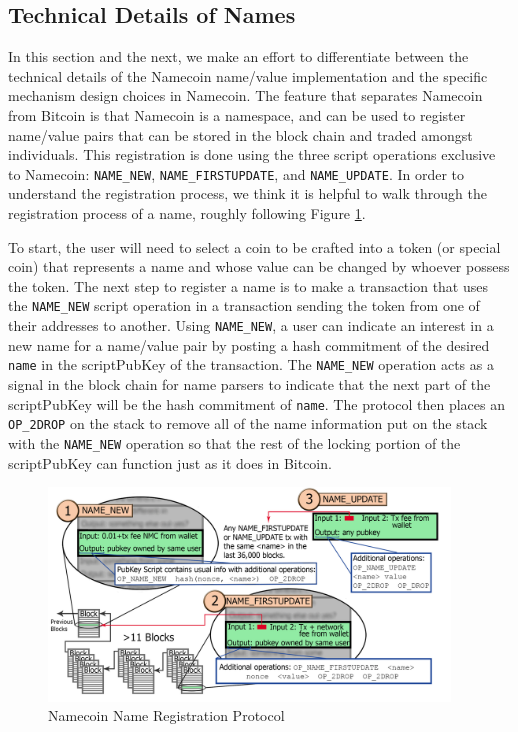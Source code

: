 \subsection{Technical Details of Names}

In this section and the next, we make an effort to differentiate between the technical details of the Namecoin name/value implementation and the specific mechanism design choices in Namecoin. The feature that separates Namecoin from Bitcoin is that Namecoin is a namespace, and can be used to register name/value pairs that can be stored in the block chain and traded amongst individuals. This registration is done using the three script operations exclusive to Namecoin: {\tt NAME\_NEW}, {\tt NAME\_FIRSTUPDATE}, and {\tt NAME\_UPDATE}. In order to understand the registration process, we think it is helpful to walk through the registration process of a name, roughly following Figure \ref{fig:registration}. 

To start, the user will need to select a coin to be crafted into a token (or special coin) that represents a name and whose value can be changed by whoever possess the token. The next step to register a name is to make a transaction that uses the {\tt NAME\_NEW} script operation in a transaction sending the token from one of their addresses to another. Using {\tt NAME\_NEW}, a user can indicate an interest in a new name for a name/value pair by posting a hash commitment of the desired {\tt name} in the scriptPubKey of the transaction. The {\tt NAME\_NEW} operation acts as a signal in the block chain for name parsers to indicate that the next part of the scriptPubKey will be the hash commitment of {\tt name}. The protocol then places an {\tt OP\_2DROP} on the stack to remove all of the name information put on the stack with the {\tt NAME\_NEW} operation so that the rest of the locking portion of the scriptPubKey can function just as it does in Bitcoin. 

\begin{figure}
  \centering
  \includegraphics[width=0.95\textwidth]{registration.png}
  \caption{Namecoin Name Registration Protocol}
  \label{fig:registration}
\end{figure}

